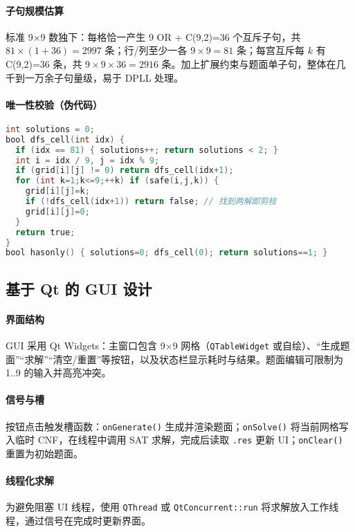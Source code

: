 \documentclass[UTF8]{ctexart}
\begin{document}
\paragraph{子句规模估算}
标准 9\(\times\)9 数独下：每格恰一产生 9 OR + C(9,2)=36 个互斥子句，共 \(81\times(1+36)=2997\) 条；行/列至少一各 \(9\times9=81\) 条；每宫互斥每 \(k\) 有 C(9,2)=36 条，共 \(9\times9\times 36=2916\) 条。加上扩展约束与题面单子句，整体在几千到一万余子句量级，易于 DPLL 处理。

\paragraph{唯一性校验（伪代码）}
\begin{lstlisting}[language=C]
int solutions = 0;
bool dfs_cell(int idx) {
  if (idx == 81) { solutions++; return solutions < 2; }
  int i = idx / 9, j = idx % 9;
  if (grid[i][j] != 0) return dfs_cell(idx+1);
  for (int k=1;k<=9;++k) if (safe(i,j,k)) {
    grid[i][j]=k;
    if (!dfs_cell(idx+1)) return false; // 找到两解即剪枝
    grid[i][j]=0;
  }
  return true;
}
bool hasonly() { solutions=0; dfs_cell(0); return solutions==1; }
\end{lstlisting}

\subsection{基于 Qt 的 GUI 设计}
\paragraph{界面结构}
GUI 采用 Qt Widgets：主窗口包含 9\(\times\)9 网格（\texttt{QTableWidget} 或自绘）、“生成题面”“求解”“清空/重置”等按钮，以及状态栏显示耗时与结果。题面编辑可限制为 1..9 的输入并高亮冲突。

\paragraph{信号与槽}
按钮点击触发槽函数：\texttt{onGenerate()} 生成并渲染题面；\texttt{onSolve()} 将当前网格写入临时 CNF，在线程中调用 SAT 求解，完成后读取 \texttt{.res} 更新 UI；\texttt{onClear()} 重置为初始题面。

\paragraph{线程化求解}
为避免阻塞 UI 线程，使用 \texttt{QThread} 或 \texttt{QtConcurrent::run} 将求解放入工作线程，通过信号在完成时更新界面。
\end{document}
